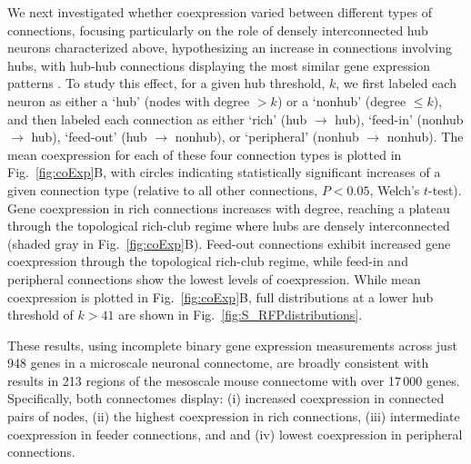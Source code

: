 \documentclass[10pt,letterpaper]{article}
\begin{document}
We next investigated whether coexpression varied between different types of connections, focusing particularly on the role of densely interconnected hub neurons characterized above, hypothesizing an increase in connections involving hubs, with hub-hub connections displaying the most similar gene expression patterns \cite{Fulcher:2016ck}.
To study this effect, for a given hub threshold, $k$, we first labeled each neuron as either a `hub' (nodes with degree $> k$) or a `nonhub' (degree $\leq k$), and then labeled each connection as either `rich' (hub $\rightarrow$ hub), `feed-in' (nonhub $\rightarrow$ hub), `feed-out' (hub $\rightarrow$ nonhub), or `peripheral' (nonhub $\rightarrow$ nonhub).
The mean coexpression for each of these four connection types is plotted in Fig.~\ref{fig:coExp}B, with circles indicating statistically significant increases of a given connection type (relative to all other connections, $P < 0.05$, Welch's $t$-test). 
Gene coexpression in rich connections increases with degree, reaching a plateau through the topological rich-club regime where hubs are densely interconnected (shaded gray in Fig.~\ref{fig:coExp}B).
Feed-out connections exhibit increased gene coexpression through the topological rich-club regime, while feed-in and peripheral connections show the lowest levels of coexpression.
While mean coexpression is plotted in Fig.~\ref{fig:coExp}B, full distributions at a lower hub threshold of $k > 41$ are shown in Fig.~\ref{fig:S_RFPdistributions}.

These results, using incomplete binary gene expression measurements across just 948 genes in a microscale neuronal connectome, are broadly consistent with results in 213 regions of the mesoscale mouse connectome with over 17\,000 genes.
Specifically, both connectomes display:
(i) increased coexpression in connected pairs of nodes,
(ii) the highest coexpression in rich connections,
(iii) intermediate coexpression in feeder connections, and
and (iv) lowest coexpression in peripheral connections.
\end{document}
